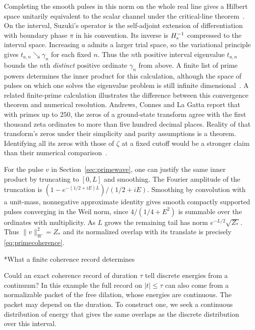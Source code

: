 \documentclass[11pt,letterpaper]{article}
\makeatletter
\renewcommand\subsection{\@startsection{subsection}{2}{\z@}{-2.0ex plus -.3ex}{.75ex}{\normalfont\normalsize\itshape}}
\numberwithin{equation}{section}
\makeatother
\begin{document}
Completing the smooth pulses in this norm on the whole real line gives a Hilbert space unitarily equivalent to the scalar channel under the critical-line theorem~\cite{suzukiglobal}. On the interval, Suzuki's operator is the self-adjoint extension of differentiation with boundary phase $\pi$ in his convention. Its inverse is $H_{\rm s}^{-1}$ compressed to the interval space. Increasing $a$ admits a larger trial space, so the variational principle gives $t_{a,n}\searrow\gamma_n$ for each fixed $n$. Thus the $n$th positive interval eigenvalue $t_{a,n}$ bounds the $n$th \emph{distinct} positive ordinate $\gamma_n$ from above. A finite list of prime powers determines the inner product for this calculation, although the space of pulses on which one solves the eigenvalue problem is still infinite dimensional~\cite{suzukiconvergence}. A related finite-prime calculation illustrates the difference between this convergence theorem and numerical resolution. Andrews, Connes and La Gatta report that with primes up to $250$, the zeros of a ground-state transform agree with the first thousand zeta ordinates to more than five hundred decimal places. Reality of that transform's zeros under their simplicity and parity assumptions is a theorem. Identifying all its zeros with those of $\zeta$ at a fixed cutoff would be a stronger claim than their numerical comparison~\cite{prolate}.

For the pulse $v$ in Section~\ref{sec:primewave}, one can justify the same inner product by truncating to $[0,L]$ and smoothing. The Fourier amplitude of the truncation is $(1-e^{-(1/2+iE)L})/(1/2+iE)$. Smoothing by convolution with a unit-mass, nonnegative approximate identity gives smooth compactly supported pulses converging in the Weil norm, since $4/(1/4+E^2)$ is summable over the ordinates with multiplicity. As $L$ grows the remaining tail has norm $e^{-L/2}\sqrt{Z_*}$. Thus $\|v\|_W^2=Z_*$ and its normalized overlap with its translate is precisely \eqref{eq:primecoherence}.


\subsection*{What a finite coherence record determines}\label{app:finitecoherence}

Could an exact coherence record of duration $\tau$ tell discrete energies from a continuum? In this example the full record on $|t|\le\tau$ can also come from a normalizable packet of the free dilation, whose energies are continuous. The packet may depend on the duration. To construct one, we seek a continuous distribution of energy that gives the same overlaps as the discrete distribution over this interval.
\end{document}
